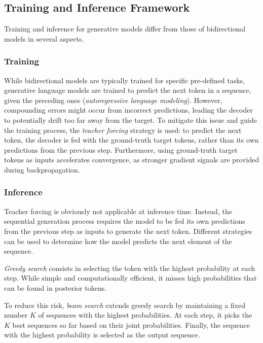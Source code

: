 \subsection{Training and Inference Framework}

Training and inference for generative models differ from those of bidirectional models in several aspects.

\subsubsection{Training} 

While bidirectional models are typically trained for specific pre-defined tasks, generative language models are trained to predict the next token in a sequence, given the preceding ones (\textit{autoregressive language modeling}). However, compounding errors might occur from incorrect predictions, leading the decoder to potentially drift too far away from the target. To mitigate this issue and guide the training process, the \textit{teacher forcing} strategy is used: to predict the next token, the decoder is fed with the ground-truth target tokens, rather than its own predictions from the previous step. Furthermore, using ground-truth target tokens as inputs accelerates convergence, as stronger gradient signals are provided during backpropagation.

\subsubsection{Inference} 

Teacher forcing is obviously not applicable at inference time. Instead, the sequential generation process requires the model to be fed its own predictions from the previous step as inputs to generate the next token. Different strategies can be used to determine how the model predicts the next element of the sequence. 

\textit{Greedy search} consists in selecting the token with the highest probability at each step. While simple and computationally efficient, it misses high probabilities that can be found in posterior tokens. 

To reduce this risk, \textit{beam search} extends greedy search by maintaining a fixed number $K$  of sequences with the highest probabilities. At each step, it picks the $K$ best sequences so far based on their joint probabilities. Finally, the sequence with the highest probability is selected as the output sequence.

